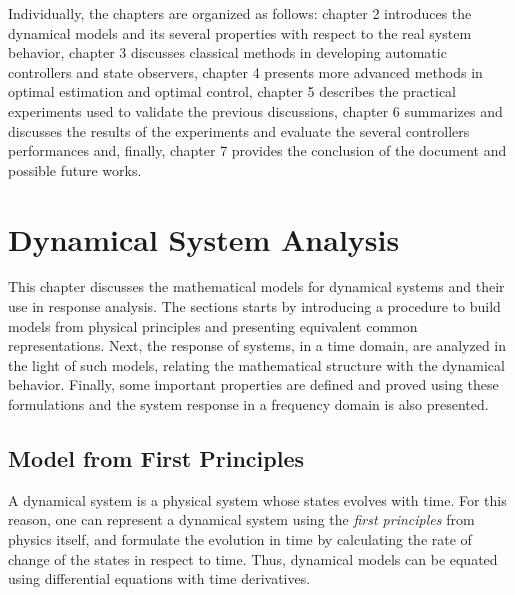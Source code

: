 \documentclass[a4paper,11pt]{book}
\numberwithin{figure}{chapter}
\numberwithin{equation}{chapter}
\numberwithin{table}{chapter}
\theoremstyle{definition}
\begin{document}
Individually, the chapters are organized as follows: chapter 2 introduces the dynamical models and its several properties with respect to the real system behavior, chapter 3 discusses classical methods in developing automatic controllers and state observers, chapter 4 presents more advanced methods in optimal estimation and optimal control, chapter 5 describes the practical experiments used to validate the previous discussions, chapter 6 summarizes and discusses the results of the experiments and evaluate the several controllers performances and, finally, chapter 7 provides the conclusion of the document and possible future works.

\clearpage
\chapter{Dynamical System Analysis}

This chapter discusses the mathematical models for dynamical systems and their use in response analysis. The sections starts by introducing a procedure to build models from physical principles and presenting equivalent common representations. Next, the response of systems, in a time domain, are analyzed in the light of such models, relating the mathematical structure with the dynamical behavior. Finally, some important properties are defined and proved using these formulations and the system response in a frequency domain is also presented.

\section{Model from First Principles}

A dynamical system is a physical system whose states evolves with time. For this reason, one can represent a dynamical system using the \textit{first principles} from physics itself, and formulate the evolution in time by calculating the rate of change of the states in respect to time. Thus, dynamical models can be equated using differential equations with time derivatives. 
\end{document}
